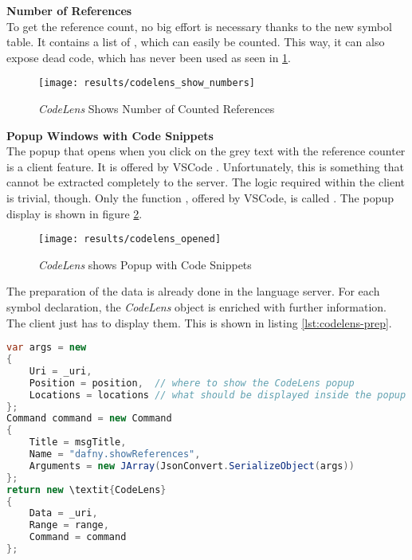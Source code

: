 \textbf{Number of References} \\
To get the reference count, no big effort is necessary thanks to the new symbol table.
It contains a list of , which can easily be counted.
This way, it can also expose dead code, which has never been used as seen in \ref{fig:codelens_show_ref_number}. \\

\begin{figure}[H]
    \centering
    \texttt{[image: results/codelens\_show\_numbers]}
    \caption{\textit{CodeLens} Shows Number of Counted References}
    \label{fig:codelens_show_ref_number}
\end{figure}

\textbf{Popup Windows with Code Snippets} \\
The popup that opens when you click on the grey text
with the reference counter is a client feature.
It is offered by VSCode \cite{vscodeAPI}.
Unfortunately, this is something that cannot be extracted completely to the server.
The logic required within the client is trivial, though.
Only the function ,
offered by VSCode, is called \cite{vscodeAPI}.
The popup display is shown in figure \ref{fig:codelens_show_popup}. \\

\begin{figure}[H]
    \centering
    \texttt{[image: results/codelens\_opened]}
    \caption{\textit{CodeLens} shows Popup with Code Snippets}
    \label{fig:codelens_show_popup}
\end{figure}

The preparation of the data is already done in the language server.
For each symbol declaration, the \textit{CodeLens} object is enriched with further information.
The client just has to display them.
This is shown in listing \ref{lst:codelens-prep}.

\begin{lstlisting}[language=csharp, caption={LSP Handler Implementation}, captionpos=b, label={lst:codelens-prep}]
var args = new
{
    Uri = _uri,
    Position = position,  // where to show the CodeLens popup
    Locations = locations // what should be displayed inside the popup
};
Command command = new Command
{
    Title = msgTitle,
    Name = "dafny.showReferences",
    Arguments = new JArray(JsonConvert.SerializeObject(args))
};
return new \textit{CodeLens}
{
    Data = _uri,
    Range = range,
    Command = command
};
\end{lstlisting}

